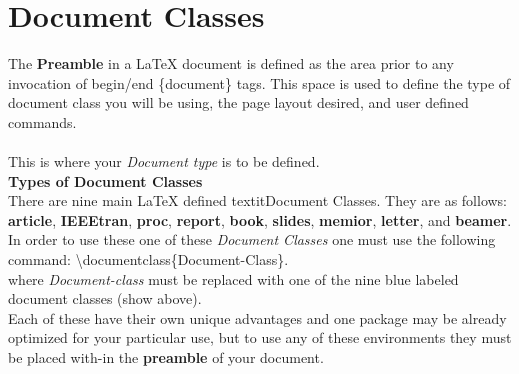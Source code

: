\section{Document Classes} 
The \textbf{Preamble} in a \LaTeX{} 
document is defined as the area prior to any invocation of 
begin/end \{document\} tags. This space is used to define the 
type of document class you will be using, the page layout desired,
and user defined commands.\\ 

\\

This is where your \textit{Document type} is to be defined. \\

\textbf{Types of Document Classes}\\
There are nine main \LaTeX{} defined textit{Document Classes}.
They are as follows: \\
{\color{blue} \textbf{article}},
{\color{blue} \textbf{IEEEtran}},
{\color{blue} \textbf{proc}},
{\color{blue} \textbf{report}}, 
{\color{blue} \textbf{book}}, 
{\color{blue} \textbf{slides}}, 
{\color{blue} \textbf{memior}}, 
{\color{blue} \textbf{letter}}, and 
{\color{blue} \textbf{beamer}}.\\

In order to use these one of these \textit{Document Classes} one must
use the following command: 
\textbackslash{documentclass\{Document-Class\}}. \\ 
where \textit{Document-class} must be replaced with one of the nine
blue labeled document classes (show above). \\
Each of these have their own unique advantages and one package may
be already optimized for your particular use, but to use any of these 
environments they must be placed with-in the \textbf{preamble} 
of your document. \\


